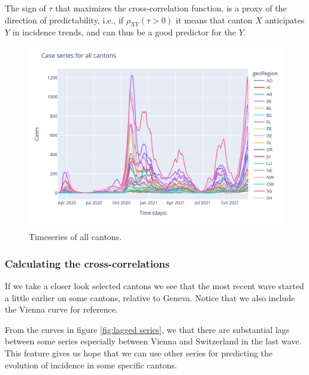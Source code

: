 \documentclass[11pt]{article}
\begin{document}
The sign of \(\tau\) that maximizes the cross-correlation function, is a
proxy of the direction of predictability, i.e., if \(\rho_{XY}(\tau>0)\)
it means that canton \(X\) anticipates \(Y\) in incidence trends, and
can thus be a good predictor for the \(Y\).

\begin{figure}
 \centering
 \includegraphics[width=\linewidth]{canton_series.png}
 \caption{Timeseries of all cantons.}
 \label{fig:canton_series}
\end{figure}

    
    
    \hypertarget{calculating-the-cross-correlations}{%
\subsubsection{Calculating the
cross-correlations}\label{calculating-the-cross-correlations}}

If we take a closer look selected cantons we see that the most recent
wave started a little earlier on some cantons, relative to Geneva.
Notice that we also include the Vienna curve for reference.

From the curves in figure \ref{fig:lagged series}, we that there are substantial lags between some series especially between Vienna and Switzerland in the last wave. This feature gives us hope that we can use other series for predicting the evolution of incidence in some specific cantons.
\end{document}
